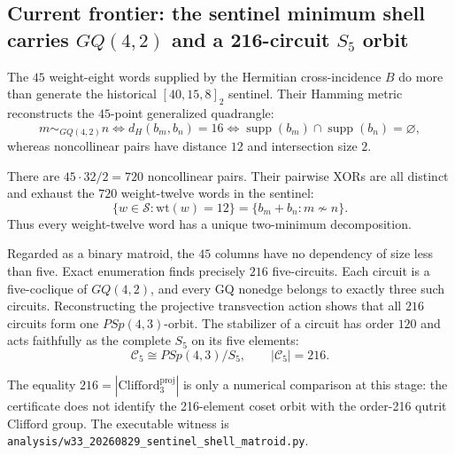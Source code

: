 \subsection*{Current frontier: the sentinel minimum shell carries \(GQ(4,2)\) and a 216-circuit \(S_5\) orbit}

The \(45\) weight-eight words supplied by the Hermitian cross-incidence
\(B\) do more than generate the historical \([40,15,8]_2\) sentinel. Their
Hamming metric reconstructs the \(45\)-point generalized quadrangle:
\[
 m\sim_{GQ(4,2)}n
 \iff d_H(b_m,b_n)=16
 \iff \operatorname{supp}(b_m)\cap\operatorname{supp}(b_n)=\varnothing,
\]
whereas noncollinear pairs have distance \(12\) and intersection size \(2\).

There are \(45\cdot32/2=720\) noncollinear pairs. Their pairwise XORs are
all distinct and exhaust the \(720\) weight-twelve words in the sentinel:
\[
 \boxed{\;
 \{w\in\mathcal S:\mathrm{wt}(w)=12\}
 =
 \{b_m+b_n:m\not\sim n\}.
 \;}
\]
Thus every weight-twelve word has a unique two-minimum decomposition.

Regarded as a binary matroid, the \(45\) columns have no dependency of size
less than five. Exact enumeration finds precisely \(216\) five-circuits.
Each circuit is a five-coclique of \(GQ(4,2)\), and every GQ nonedge belongs
to exactly three such circuits. Reconstructing the projective transvection
action shows that all \(216\) circuits form one \(PSp(4,3)\)-orbit. The
stabilizer of a circuit has order \(120\) and acts faithfully as the complete
\(S_5\) on its five elements:
\[
 \boxed{\;
 \mathcal C_5\cong PSp(4,3)/S_5,
 \qquad |\mathcal C_5|=216.
 \;}
\]

The equality \(216=|\mathrm{Clifford}_3^{\mathrm{proj}}|\) is only a numerical
comparison at this stage: the certificate does not identify the 216-element
coset orbit with the order-216 qutrit Clifford group. The executable witness
is \texttt{analysis/w33\_20260829\_sentinel\_shell\_matroid.py}.
